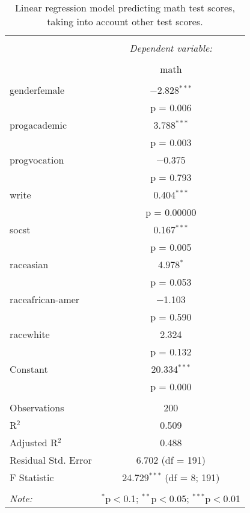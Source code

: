
\begin{table}[!htbp] \centering 
  \caption{Linear regression model predicting math test scores, taking into 
          account other test scores.} 
  \label{tab::lm_math_peeking} 
\begin{tabular}{@{\extracolsep{5pt}}lc} 
\\[-1.8ex]\hline 
\hline \\[-1.8ex] 
 & \multicolumn{1}{c}{\textit{Dependent variable:}} \\ 
\cline{2-2} 
\\[-1.8ex] & math \\ 
\hline \\[-1.8ex] 
 genderfemale & $-$2.828$^{***}$ \\ 
  & p = 0.006 \\ 
  progacademic & 3.788$^{***}$ \\ 
  & p = 0.003 \\ 
  progvocation & $-$0.375 \\ 
  & p = 0.793 \\ 
  write & 0.404$^{***}$ \\ 
  & p = 0.00000 \\ 
  socst & 0.167$^{***}$ \\ 
  & p = 0.005 \\ 
  raceasian & 4.978$^{*}$ \\ 
  & p = 0.053 \\ 
  raceafrican-amer & $-$1.103 \\ 
  & p = 0.590 \\ 
  racewhite & 2.324 \\ 
  & p = 0.132 \\ 
  Constant & 20.334$^{***}$ \\ 
  & p = 0.000 \\ 
 \hline \\[-1.8ex] 
Observations & 200 \\ 
R$^{2}$ & 0.509 \\ 
Adjusted R$^{2}$ & 0.488 \\ 
Residual Std. Error & 6.702 (df = 191) \\ 
F Statistic & 24.729$^{***}$ (df = 8; 191) \\ 
\hline 
\hline \\[-1.8ex] 
\textit{Note:}  & \multicolumn{1}{r}{$^{*}$p$<$0.1; $^{**}$p$<$0.05; $^{***}$p$<$0.01} \\ 
\end{tabular} 
\end{table} 
